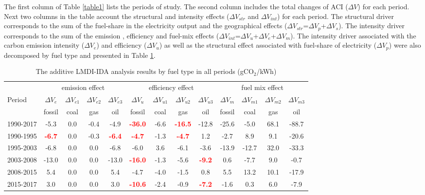 \documentclass[energies,article,accept,moreauthors,12pt,a4paper]{mdpi} %
\begin{document}
The first column of Table \ref{table1} lists the periods of study. The second column includes the total changes of ACI ($\Delta V$)  for each period.  Next two columns in the table account the structural and intensity effects ($\Delta V_{str}$ and $\Delta V_{int}$)  for each period. The structural  driver corresponds to the sum of the fuel-share in the electricity output and the geographical effects  ($\Delta V_{str}$=$\Delta V_{p}$+$\Delta V_{s}$). The intensity driver  corresponds to the sum of the emission , efficiency and fuel-mix effects  ($\Delta V_{int}$=$\Delta V_{u}$+$\Delta V_{e}$+$\Delta V_{m}$). The intensity driver  associated with the carbon emission intensity ($\Delta V_{e}$) and  efficiency ($\Delta V_{u}$) as well as
the structural effect  associated with fuel-share of electricity ($\Delta V_{p}$) were also decomposed by fuel type and presented in Table \ref{table2}. 





\begin{table}[!h]\label{11}										
\begin{center}\caption{The additive LMDI-IDA analysis results by fuel type in all periods (gCO$_2$/kWh)}			
\begin{tabular}{l|cccc|cccc|cccc}\hline	
 	&\multicolumn{4}{c|}{emission effect}	&\multicolumn{4}{c|}{efficiency effect}	 	&\multicolumn{4}{c}{fuel mix effect}		\\ 
 	Period	&$	\Delta V_e	$&$	\Delta V_{e1}	$&$	\Delta V_{e2}	$&$	\Delta V_{e3}	$&$	\Delta V_{u}	$&$	\Delta V_{u1}	$&$	\Delta V_{u2}	$&$	\Delta V_{u3}	$&$	\Delta V_{m}	$&$	\Delta V_{m1}	$&$	\Delta V_{m2}	$&$	\Delta V_{m3}$	\\ 
 	& fossil	 &	coal	&	gas	&	oil	&	fossil  	&	coal	&	gas	&	oil	&	fossil 	& coal	 &	gas	&	oil		\\\hline
1990-2017	&	-5.3	&	0.0	&	-0.4	&	-4.9	&	\textcolor{red}{\textbf{-36.0}}	&	-6.6	&	\textcolor{red}{\textbf{-16.5}}	&	-12.8	&	-25.6	&	-5.0	&	68.1	&	-88.7	\\\hline
1990-1995	&	\textcolor{red}{\textbf{-6.7}}	&	0.0	&	-0.3	&	\textcolor{red}{\textbf{-6.4	}}&	\textcolor{red}{\textbf{-4.7	}}&	-1.3	&	\textcolor{red}{\textbf{-4.7}}	&	1.2	&	-2.7	&	8.9	&	9.1	&	-20.6	\\
1995-2003	&	-6.8	&	0.0	&	0.0	&	-6.8	&	-6.0	&	3.6	&	-6.1	&	-3.6	&	-13.9	&	-12.7	&	32.0	&	-33.3	\\
2003-2008	&	-13.0	&	0.0	&	0.0	&	-13.0	&	\textcolor{red}{\textbf{-16.0}}	&	-1.3	&	-5.6	&	\textcolor{red}{\textbf{-9.2}}	&	0.6	&	-7.7	&	9.0	&	-0.7	\\
2008-2015	&	5.4	&	0.0	&	0.0	&	5.4	&	-4.7	&	-4.0	&	-1.5	&	0.8	&	5.5	&	13.2	&	10.1	&	-17.9	\\
2015-2017	&	3.0	&	0.0	&	0.0	&	3.0	&	\textcolor{red}{\textbf{-10.6}}	&	-2.4	&	-0.9	&	\textcolor{red}{\textbf{-7.2}}	&	-1.6	&	0.3	&	6.0	&	-7.9	\\\hline
\end{tabular}\label{table2}										
\end{center}										
\end{table}
\end{document}
